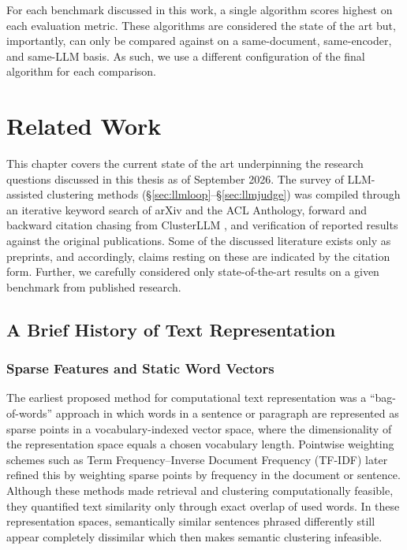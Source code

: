 \documentclass[11pt,a4paper,oneside]{report}
\begin{document}
\vspace{\baselineskip}

For each benchmark discussed in this work, a single algorithm scores highest on each evaluation metric. These algorithms are considered the state of the art but, importantly, can only be compared against on a same-document, same-encoder, and same-LLM basis. As such, we use a different configuration of the final algorithm for each comparison.

\chapter{Related Work}\label{ch:litreview}

This chapter covers the current state of the art underpinning the research questions discussed in this thesis as of September 2026. The survey of LLM-assisted clustering methods (\S\ref{sec:llmloop}--\S\ref{sec:llmjudge}) was compiled through an iterative keyword search of arXiv and the ACL Anthology, forward and backward citation chasing from ClusterLLM \citep{zhang2023clusterllm}, and verification of reported results against the original publications. Some of the discussed literature exists only as preprints, and accordingly, claims resting on these are indicated by the citation form. Further, we carefully considered only state-of-the-art results on a given benchmark from published research.

\section{A Brief History of Text Representation}\label{sec:representation}

\subsection{Sparse Features and Static Word Vectors}

The earliest proposed method for computational text representation \citep{salton1975vector} was a ``bag-of-words'' approach in which words in a sentence or paragraph are represented as sparse points in a vocabulary-indexed vector space, where the dimensionality of the representation space equals a chosen vocabulary length. Pointwise weighting schemes such as Term Frequency--Inverse Document Frequency (TF-IDF) \citep{salton1988term} later refined this by weighting sparse points by frequency in the document or sentence. Although these methods made retrieval and clustering computationally feasible, they quantified text similarity only through exact overlap of used words. In these representation spaces, semantically similar sentences phrased differently still appear completely dissimilar which then makes semantic clustering infeasible.
\end{document}

